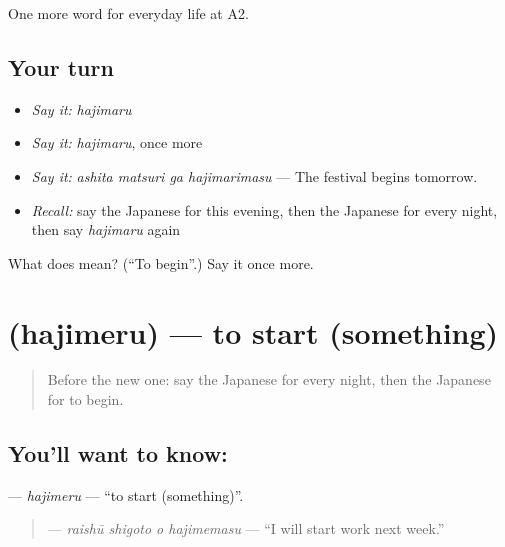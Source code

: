 \begin{grammarlens}[title={What you've built}]
One more word for everyday life at A2.
\end{grammarlens}

\subsection*{Your turn}
\begin{itemize}
\raggedright
  \item \emph{Say it:} \emph{hajimaru}
  \item \emph{Say it:} \emph{hajimaru}, once more
  \item \emph{Say it:} \emph{ashita matsuri ga hajimarimasu} — The festival begins tomorrow.
  \item \emph{Recall:} say the Japanese for this evening, then the Japanese for every night, then say \emph{hajimaru} again
\end{itemize}

\begin{tcolorbox}[breakable,colback=teal!4,colframe=teal!35!black,title={Before you move on}]
What does  mean? (\textquotedblleft{}To begin\textquotedblright{}.) Say it once more.
\end{tcolorbox}
\section[\texorpdfstring{\ja{はじめる} (hajimeru)}{はじめる (hajimeru)}]{ (hajimeru) — to start (something)}

\label{lesson:JA-C167-hajimeru}



\begin{quote}
Before the new one: say the Japanese for every night, then the Japanese for to begin.
\end{quote}

\subsection*{You'll want to know: }
\textbf{} — \emph{hajimeru} — \textquotedblleft{}to start (something)\textquotedblright{}.

\begin{quote}
\textbf{  } — \emph{raishū shigoto o hajimemasu} — \textquotedblleft{}I will start work next week.\textquotedblright{}
\end{quote}

